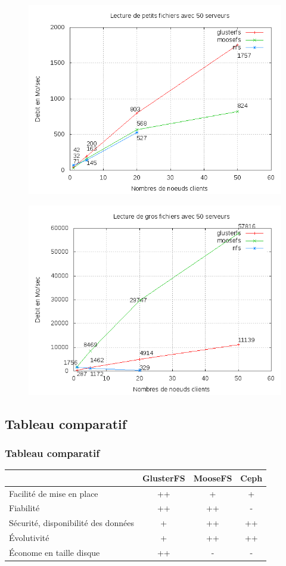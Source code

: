 \documentclass[blue]{beamer}
\begin{document}
		\begin{frame}
			\begin{figure}
				\includegraphics[width=0.8\linewidth]{../images/srv50rs2.png}
			\end{figure}
		\end{frame}

		\begin{frame}
			\begin{figure}
				\includegraphics[width=0.8\linewidth]{../images/srv50rb2.png}
			\end{figure}
		\end{frame}

	\subsection{Tableau comparatif}
		\begin{frame}
		\frametitle{Tableau comparatif}
			\begin{tabular}{|l|c|c|c|}
				\hline
				& \bf{GlusterFS} & \bf{MooseFS} & \bf{Ceph}\\
				\hline
				Facilité de mise en place & ++ & + & +\\
				\hline
				Fiabilité & ++ & ++ & -\\
				\hline
				Sécurité, disponibilité des données & + & ++ & ++ \\
				\hline
				Évolutivité & + & ++  & ++\\
				\hline
				Économe en taille disque & ++ & - & - \\
				\hline
			\end{tabular}
		\end{frame}
\end{document}
